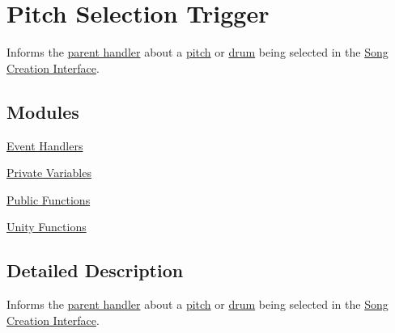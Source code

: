\hypertarget{group___doc_s_c___p_s_t}{}\section{Pitch Selection Trigger}
\label{group___doc_s_c___p_s_t}


Informs the \hyperlink{group___doc_s_c___p_s_c}{parent handler} about a \hyperlink{group___music_enums_ga508f69b199ea518f935486c990edac1d}{pitch} or \hyperlink{group___music_enums_gade475b4382c7066d1af13e7c13c029b6}{drum} being selected in the \hyperlink{group___doc_s_c}{Song Creation Interface}.  


\subsection*{Modules}
\begin{DoxyCompactItemize}
\item 
\hyperlink{group___s_c___p_s_t_handlers}{Event Handlers}
\item 
\hyperlink{group___s_c___p_s_t_priv_var}{Private Variables}
\item 
\hyperlink{group___s_c___p_s_t_pub_func}{Public Functions}
\item 
\hyperlink{group___s_c___p_s_t_unity}{Unity Functions}
\end{DoxyCompactItemize}


\subsection{Detailed Description}
Informs the \hyperlink{group___doc_s_c___p_s_c}{parent handler} about a \hyperlink{group___music_enums_ga508f69b199ea518f935486c990edac1d}{pitch} or \hyperlink{group___music_enums_gade475b4382c7066d1af13e7c13c029b6}{drum} being selected in the \hyperlink{group___doc_s_c}{Song Creation Interface}. 

